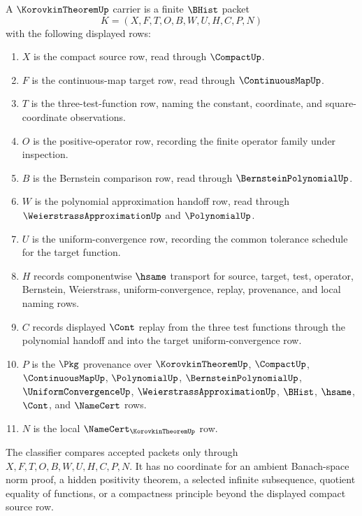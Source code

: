 \begin{definition}
\label{def:korovkin-theorem-carrier}
A $\KorovkinTheoremUp$ carrier is a finite $\BHist$ packet
$$
K=(X,F,T,O,B,W,U,H,C,P,N)
$$
with the following displayed rows:
\begin{enumerate}
\item $X$ is the compact source row, read through $\CompactUp$.
\item $F$ is the continuous-map target row, read through $\ContinuousMapUp$.
\item $T$ is the three-test-function row, naming the constant, coordinate, and square-coordinate observations.
\item $O$ is the positive-operator row, recording the finite operator family under inspection.
\item $B$ is the Bernstein comparison row, read through $\BernsteinPolynomialUp$.
\item $W$ is the polynomial approximation handoff row, read through $\WeierstrassApproximationUp$ and $\PolynomialUp$.
\item $U$ is the uniform-convergence row, recording the common tolerance schedule for the target function.
\item $H$ records componentwise $\hsame$ transport for source, target, test, operator, Bernstein, Weierstrass, uniform-convergence, replay, provenance, and local naming rows.
\item $C$ records displayed $\Cont$ replay from the three test functions through the polynomial handoff and into the target uniform-convergence row.
\item $P$ is the $\Pkg$ provenance over $\KorovkinTheoremUp$, $\CompactUp$, $\ContinuousMapUp$, $\PolynomialUp$, $\BernsteinPolynomialUp$, $\UniformConvergenceUp$, $\WeierstrassApproximationUp$, $\BHist$, $\hsame$, $\Cont$, and $\NameCert$ rows.
\item $N$ is the local $\NameCert_{\KorovkinTheoremUp}$ row.
\end{enumerate}
The classifier compares accepted packets only through $X,F,T,O,B,W,U,H,C,P,N$. It has no coordinate for an ambient Banach-space norm proof, a hidden positivity theorem, a selected infinite subsequence, quotient equality of functions, or a compactness principle beyond the displayed compact source row.
\end{definition}

